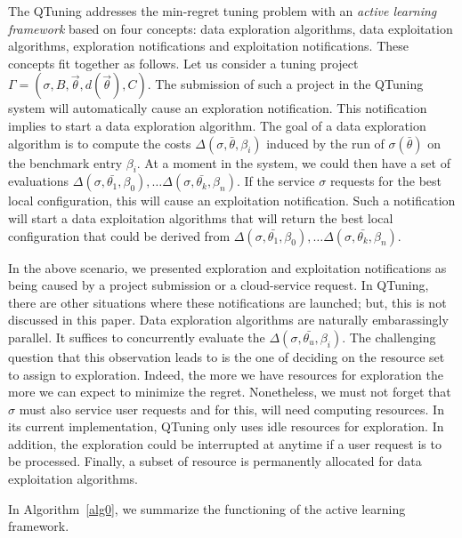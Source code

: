 \documentclass[10pt, conference, compsocconf]{IEEEtran}
\begin{document}
The QTuning addresses the min-regret tuning problem with an {\it active learning framework}
based on four concepts: data exploration algorithms, data exploitation algorithms,
exploration notifications and exploitation notifications. These concepts fit together as follows. Let us consider
a tuning project  $\Gamma = (\sigma, B, \vec{\theta}, d(\vec{\theta}), C)$. The submission of such a project
in the QTuning system will automatically cause an exploration notification. This notification implies
to start a data exploration algorithm. The goal of a data exploration algorithm is to
compute the costs $\Delta(\sigma, \bar{\theta}, \beta_i)$  induced by the run of  $\sigma(\bar{\theta})$ on the benchmark
entry $\beta_i$.  At a moment in the system, we could then have a set of evaluations
$\Delta(\sigma, \bar{\theta_1}, \beta_0), \dots \Delta(\sigma, \bar{\theta_k}, \beta_n)$. If the service $\sigma$
 requests for the best local configuration, this will cause an exploitation notification. Such a notification will
start a data exploitation algorithms that will return the best local configuration that could be derived from
$\Delta(\sigma, \bar{\theta_1}, \beta_0), \dots \Delta(\sigma, \bar{\theta_k}, \beta_n)$.

In the above scenario, we presented exploration and exploitation notifications as being caused by a project submission or a cloud-service
request. In QTuning, there are other situations where these notifications are launched; but, this is not discussed in this paper.
Data exploration algorithms are naturally embarassingly parallel. It suffices to concurrently evaluate
the $\Delta(\sigma, \bar{\theta_u}, \beta_i)$. The challenging question that this observation leads to is the
one of deciding on the resource set to assign to  exploration. Indeed, the more we have resources for exploration
the more we can expect to minimize the regret. Nonetheless, we must not forget that $\sigma$ must also service
user requests and for this, will need computing resources. In its current implementation, QTuning only uses
idle resources for exploration. In addition, the exploration could be interrupted at anytime if a user
request is to be processed. Finally, a subset of resource is permanently allocated for data exploitation algorithms.

In Algorithm~\ref{alg0}, we summarize the functioning of the active learning framework.
\end{document}
